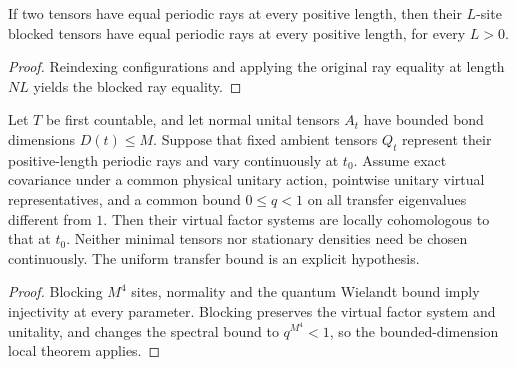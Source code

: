 \begin{lemma}
    \label{lem:spc_aux_positive_ray_blocking}
    \leanok
    If two tensors have equal periodic rays at every positive length, then
    their $L$-site blocked tensors have equal periodic rays at every positive
    length, for every $L>0$.
\end{lemma}
\begin{proof}\leanok
    Reindexing configurations and applying the original ray equality at
    length $NL$ yields the blocked ray equality.
\end{proof}

\begin{lemma}
    \label{thm:spc_aux_bounded_normal_local_class}
    \leanok
    Let $T$ be first countable, and let normal unital tensors $A_t$ have
    bounded bond dimensions $D(t)\le M$. Suppose that fixed ambient tensors
    $Q_t$ represent their positive-length periodic rays and vary continuously
    at $t_0$. Assume exact covariance under a common physical unitary action,
    pointwise unitary virtual representatives, and a common bound
    $0\le q<1$ on all transfer eigenvalues different from $1$. Then their
    virtual factor systems are locally cohomologous to that at $t_0$.
    Neither minimal tensors nor stationary densities need be chosen
    continuously. The uniform transfer bound is an explicit hypothesis.
\end{lemma}
\begin{proof}\leanok
    Blocking $M^4$ sites, normality and the quantum Wielandt bound imply
    injectivity at every parameter. Blocking preserves the virtual factor
    system and unitality, and changes the spectral bound to $q^{M^4}<1$, so
    the bounded-dimension local theorem applies.
\end{proof}


